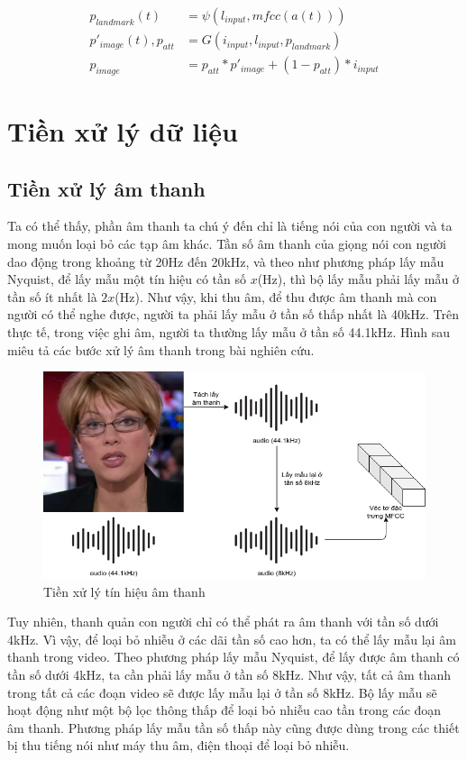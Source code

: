 \begin{equation}
    \begin{split}
    p_{landmark}(t) &= \psi(l_{input}, mfcc(a(t)))\\
    p'_{image}(t), p_{att} &= G(i_{input}, l_{input}, p_{landmark})\\
    p_{image} &= p_{att}*p'_{image}+(1-p_{att})*i_{input}
    \end{split}
\end{equation}

\section{Tiền xử lý dữ liệu}

\subsection{Tiền xử lý âm thanh}
Ta có thể thấy, phần âm thanh ta chú ý đến chỉ là tiếng nói của con người và ta mong muốn loại bỏ các tạp âm khác. Tần số âm thanh của giọng nói con người dao động trong khoảng từ 20Hz đến 20kHz, và theo như phương pháp lấy mẫu Nyquist, để lấy mẫu một tín hiệu có tần số $x$(Hz), thì bộ lấy mẫu phải lấy mẫu ở tần số ít nhất là $2x$(Hz). Như vậy, khi thu âm, để thu được âm thanh mà con người có thể nghe được, người ta phải lấy mẫu ở tần số thấp nhất là 40kHz. Trên thực tế, trong việc ghi âm, người ta thường lấy mẫu ở tần số 44.1kHz. Hình sau miêu tả các bước xử lý âm thanh trong bài nghiên cứu.

\begin{figure}[H]
    \centering
    \includegraphics[width=12cm]{./content/materials/preprocess-audio.png}
    \caption{Tiền xử lý tín hiệu âm thanh}
\end{figure}

Tuy nhiên, thanh quản con người chỉ có thể phát ra âm thanh với tần số dưới 4kHz. Vì vậy, để loại bỏ nhiễu ở các dãi tần số cao hơn, ta có thể lấy mẫu lại âm thanh trong video. Theo phương pháp lấy mẫu Nyquist, để lấy được âm thanh có tần số dưới 4kHz, ta cần phải lấy mẫu ở tần số 8kHz. Như vậy, tất cả âm thanh trong tất cả các đoạn video sẽ được lấy mẫu lại ở tần số 8kHz. Bộ lấy mẫu sẽ hoạt động như một bộ lọc thông thấp để loại bỏ nhiễu cao tần trong các đoạn âm thanh. Phương pháp lấy mẫu tần số thấp này cũng được dùng trong các thiết bị thu tiếng nói như máy thu âm, điện thoại để loại bỏ nhiễu.

